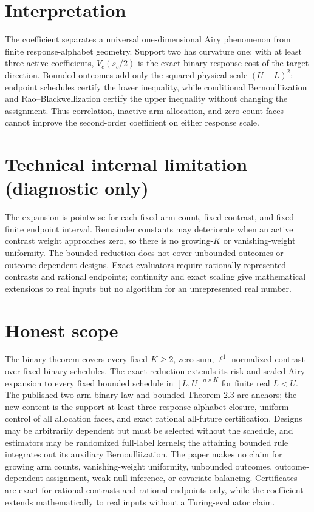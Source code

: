 \documentclass{article}
\begin{document}
\section{Interpretation}

The coefficient separates a universal one-dimensional Airy phenomenon from finite response-alphabet geometry. Support two has curvature one; with at least three active coefficients, \(V_c(s_c/2)\) is the exact binary-response cost of the target direction. Bounded outcomes add only the squared physical scale \((U-L)^2\): endpoint schedules certify the lower inequality, while conditional Bernoulliization and Rao--Blackwellization certify the upper inequality without changing the assignment. Thus correlation, inactive-arm allocation, and zero-count faces cannot improve the second-order coefficient on either response scale.

\section*{Technical internal limitation (diagnostic only)}

The expansion is pointwise for each fixed arm count, fixed contrast, and fixed finite endpoint interval. Remainder constants may deteriorate when an active contrast weight approaches zero, so there is no growing-\(K\) or vanishing-weight uniformity. The bounded reduction does not cover unbounded outcomes or outcome-dependent designs. Exact evaluators require rationally represented contrasts and rational endpoints; continuity and exact scaling give mathematical extensions to real inputs but no algorithm for an unrepresented real number.

\section{Honest scope}

The binary theorem covers every fixed \(K\ge2\), zero-sum, \(\ell^1\)-normalized contrast over fixed binary schedules. The exact reduction extends its risk and scaled Airy expansion to every fixed bounded schedule in \([L,U]^{n\times K}\) for finite real \(L<U\). The published two-arm binary law and bounded Theorem 2.3 are anchors; the new content is the support-at-least-three response-alphabet closure, uniform control of all allocation faces, and exact rational all-future certification. Designs may be arbitrarily dependent but must be selected without the schedule, and estimators may be randomized full-label kernels; the attaining bounded rule integrates out its auxiliary Bernoulliization. The paper makes no claim for growing arm counts, vanishing-weight uniformity, unbounded outcomes, outcome-dependent assignment, weak-null inference, or covariate balancing. Certificates are exact for rational contrasts and rational endpoints only, while the coefficient extends mathematically to real inputs without a Turing-evaluator claim.
\end{document}
